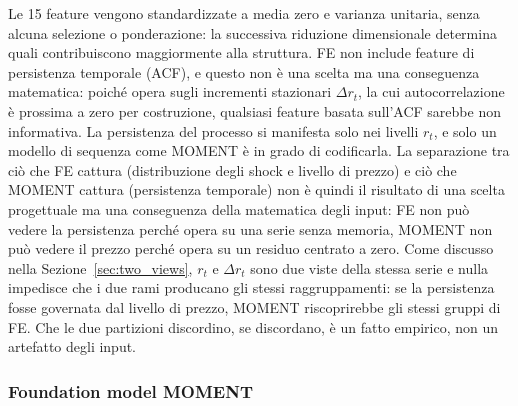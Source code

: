 \documentclass[12pt]{article}
\begin{document}
Le 15 feature vengono standardizzate a media zero e varianza unitaria, senza alcuna selezione o ponderazione: la successiva riduzione dimensionale determina quali contribuiscono maggiormente alla struttura.
FE non include feature di persistenza temporale (ACF), e questo non è una scelta ma una conseguenza matematica: poiché opera sugli incrementi stazionari $\Delta r_t$, la cui autocorrelazione è prossima a zero per costruzione, qualsiasi feature basata sull'ACF sarebbe non informativa.
La persistenza del processo si manifesta solo nei livelli $r_t$, e solo un modello di sequenza come MOMENT è in grado di codificarla.
La separazione tra ciò che FE cattura (distribuzione degli shock e livello di prezzo) e ciò che MOMENT cattura (persistenza temporale) non è quindi il risultato di una scelta progettuale ma una conseguenza della matematica degli input: FE non può vedere la persistenza perché opera su una serie senza memoria, MOMENT non può vedere il prezzo perché opera su un residuo centrato a zero.
Come discusso nella Sezione~\ref{sec:two_views}, $r_t$ e $\Delta r_t$ sono due viste della stessa serie e nulla impedisce che i due rami producano gli stessi raggruppamenti: se la persistenza fosse governata dal livello di prezzo, MOMENT riscoprirebbe gli stessi gruppi di FE.
Che le due partizioni discordino, se discordano, è un fatto empirico, non un artefatto degli input.

\subsubsection{Foundation model MOMENT}
\label{sec:repr_moment}
\end{document}
